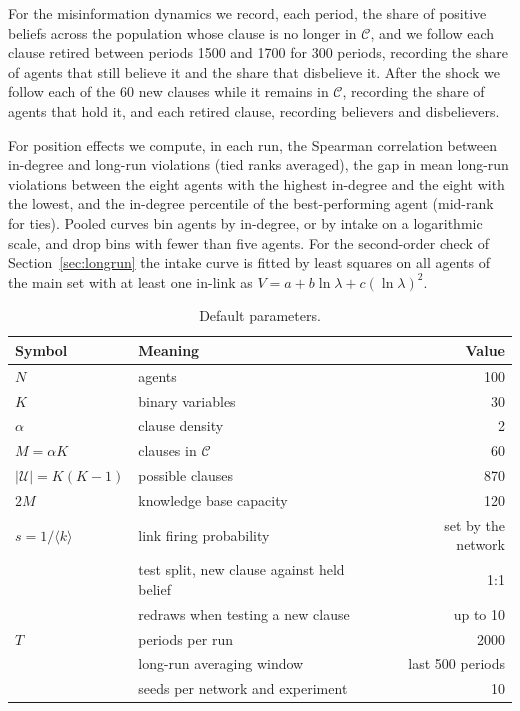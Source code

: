 \documentclass[11pt]{article}
\begin{document}
For the misinformation dynamics we record, each period, the share of positive beliefs across the population whose clause is no longer in $\mathcal{C}$, and we follow each clause retired between periods 1500 and 1700 for 300 periods, recording the share of agents that still believe it and the share that disbelieve it. After the shock we follow each of the 60 new clauses while it remains in $\mathcal{C}$, recording the share of agents that hold it, and each retired clause, recording believers and disbelievers.

For position effects we compute, in each run, the Spearman correlation between in-degree and long-run violations (tied ranks averaged), the gap in mean long-run violations between the eight agents with the highest in-degree and the eight with the lowest, and the in-degree percentile of the best-performing agent (mid-rank for ties). Pooled curves bin agents by in-degree, or by intake on a logarithmic scale, and drop bins with fewer than five agents. For the second-order check of Section~\ref{sec:longrun} the intake curve is fitted by least squares on all agents of the main set with at least one in-link as $V = a + b\ln\lambda + c(\ln\lambda)^2$.

\begin{table}[H]
\centering
\caption{Default parameters.}
\label{tab:params}
\small
\begin{tabular}{@{}llr@{}}
\toprule
Symbol & Meaning & Value \\
\midrule
$N$ & agents & 100 \\
$K$ & binary variables & 30 \\
$\alpha$ & clause density & 2 \\
$M = \alpha K$ & clauses in $\mathcal{C}$ & 60 \\
$|\mathcal{U}| = K(K-1)$ & possible clauses & 870 \\
$2M$ & knowledge base capacity & 120 \\
$s = 1/\langle k\rangle$ & link firing probability & set by the network \\
 & test split, new clause against held belief & 1:1 \\
 & redraws when testing a new clause & up to 10 \\
$T$ & periods per run & 2000 \\
 & long-run averaging window & last 500 periods \\
 & seeds per network and experiment & 10 \\
\bottomrule
\end{tabular}
\end{table}
\end{document}
